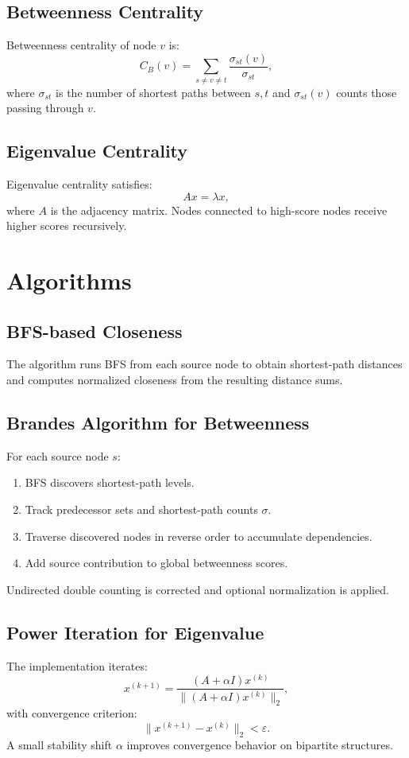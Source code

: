 \documentclass[11pt]{article}
\begin{document}
\subsection{Betweenness Centrality}
Betweenness centrality of node $v$ is:
\[
C_B(v)=\sum_{s \neq v \neq t}\frac{\sigma_{st}(v)}{\sigma_{st}},
\]
where $\sigma_{st}$ is the number of shortest paths between $s,t$ and $\sigma_{st}(v)$ counts those passing through $v$.

\subsection{Eigenvalue Centrality}
Eigenvalue centrality satisfies:
\[
A x = \lambda x,
\]
where $A$ is the adjacency matrix. Nodes connected to high-score nodes receive higher scores recursively.

\section{Algorithms}
\subsection{BFS-based Closeness}
The algorithm runs BFS from each source node to obtain shortest-path distances and computes normalized closeness from the resulting distance sums.

\subsection{Brandes Algorithm for Betweenness}
For each source node $s$:
\begin{enumerate}[leftmargin=*]
    \item BFS discovers shortest-path levels.
    \item Track predecessor sets and shortest-path counts $\sigma$.
    \item Traverse discovered nodes in reverse order to accumulate dependencies.
    \item Add source contribution to global betweenness scores.
\end{enumerate}
Undirected double counting is corrected and optional normalization is applied.

\subsection{Power Iteration for Eigenvalue}
The implementation iterates:
\[
x^{(k+1)}=\frac{(A+\alpha I)x^{(k)}}{\|(A+\alpha I)x^{(k)}\|_2},
\]
with convergence criterion:
\[
\|x^{(k+1)}-x^{(k)}\|_2 < \varepsilon.
\]
A small stability shift $\alpha$ improves convergence behavior on bipartite structures.
\end{document}
